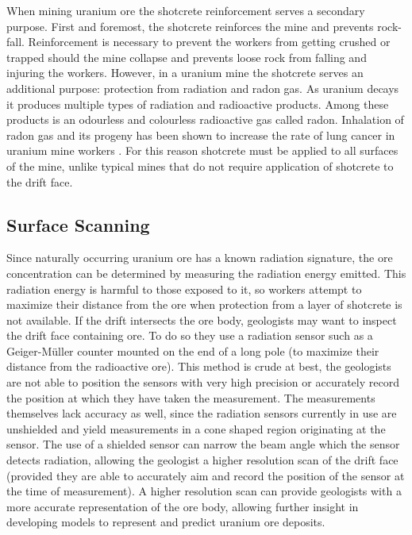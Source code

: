 When mining uranium ore the shotcrete reinforcement serves a secondary purpose. First and foremost, the shotcrete reinforces the mine and prevents rock-fall. Reinforcement is necessary to prevent the workers from getting crushed or trapped should the mine collapse and prevents loose rock from falling and injuring the workers. However, in a uranium mine the shotcrete serves an additional purpose: protection from radiation and radon gas. As uranium decays it produces multiple types of radiation and radioactive products. Among these products is an odourless and colourless radioactive gas called radon. Inhalation of radon gas and its progeny has been shown to increase the rate of lung cancer in uranium mine workers \cite{radon}. For this reason shotcrete must be applied to all surfaces of the mine, unlike typical mines that do not require application of shotcrete to the drift face.\\

\subsection{Surface Scanning}

Since naturally occurring uranium ore has a known radiation signature, the ore concentration can be determined by measuring the radiation energy emitted. This radiation energy is harmful to those exposed to it, so workers attempt to maximize their distance from the ore when protection from a layer of shotcrete is not available. If the drift intersects the ore body, geologists may want to inspect the drift face containing ore. To do so they use a radiation sensor such as a Geiger-M{\"u}ller counter mounted on the end of a long pole (to maximize their distance from the radioactive ore). This method is crude at best, the geologists are not able to position the sensors with very high precision or accurately record the position at which they have taken the measurement. The measurements themselves lack accuracy as well, since the radiation sensors currently in use are unshielded and yield measurements in a cone shaped region originating at the sensor. The use of a shielded sensor can narrow the beam angle which the sensor detects radiation, allowing the geologist a higher resolution scan of the drift face (provided they are able to accurately aim and record the position of the sensor at the time of measurement). A higher resolution scan can provide geologists with a more accurate representation of the ore body, allowing further insight in developing models to represent and predict uranium ore deposits.\\


